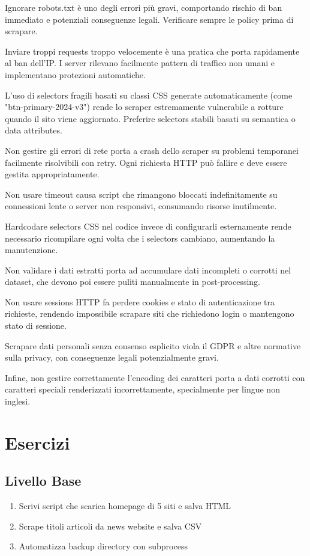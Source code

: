 \begin{tcolorbox}[title=Errori Comuni]
Ignorare robots.txt è uno degli errori più gravi, comportando rischio di ban immediato e potenziali conseguenze legali. Verificare sempre le policy prima di scrapare.

Inviare troppi requests troppo velocemente è una pratica che porta rapidamente al ban dell'IP. I server rilevano facilmente pattern di traffico non umani e implementano protezioni automatiche.

L'uso di selectors fragili basati su classi CSS generate automaticamente (come "btn-primary-2024-v3") rende lo scraper estremamente vulnerabile a rotture quando il sito viene aggiornato. Preferire selectors stabili basati su semantica o data attributes.

Non gestire gli errori di rete porta a crash dello scraper su problemi temporanei facilmente risolvibili con retry. Ogni richiesta HTTP può fallire e deve essere gestita appropriatamente.

Non usare timeout causa script che rimangono bloccati indefinitamente su connessioni lente o server non responsivi, consumando risorse inutilmente.

Hardcodare selectors CSS nel codice invece di configurarli esternamente rende necessario ricompilare ogni volta che i selectors cambiano, aumentando la manutenzione.

Non validare i dati estratti porta ad accumulare dati incompleti o corrotti nel dataset, che devono poi essere puliti manualmente in post-processing.

Non usare sessions HTTP fa perdere cookies e stato di autenticazione tra richieste, rendendo impossibile scrapare siti che richiedono login o mantengono stato di sessione.

Scrapare dati personali senza consenso esplicito viola il GDPR e altre normative sulla privacy, con conseguenze legali potenzialmente gravi.

Infine, non gestire correttamente l'encoding dei caratteri porta a dati corrotti con caratteri speciali renderizzati incorrettamente, specialmente per lingue non inglesi.
\end{tcolorbox}

\section{Esercizi}

\subsection{Livello Base}
\begin{enumerate}
  \item Scrivi script che scarica homepage di 5 siti e salva HTML
  \item Scrape titoli articoli da news website e salva CSV
  \item Automatizza backup directory con subprocess
\end{enumerate}

